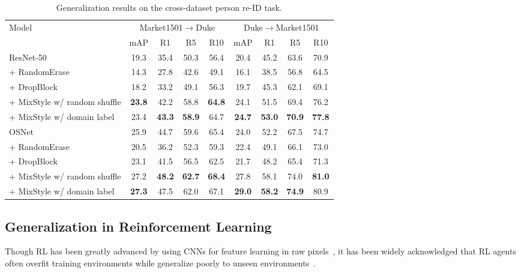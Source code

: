 \documentclass{article} \usepackage{iclr2021_conference,times}
\newcommand{\tableCellHeight}{1}
\newcommand{\tabstyle}[1]{
  \setlength{\tabcolsep}{#1}
  \renewcommand{\arraystretch}{\tableCellHeight}
  \centering
}
\begin{document}
\begin{table}[t]
\tabstyle{6pt}
\caption{Generalization results on the cross-dataset person re-ID task.}
\label{tab:result_reid}
\begin{tabular}{l | c c c c | c c c c}
\hline
\multirow{2}{*}{Model} & \multicolumn{4}{c|}{Market1501$\to$Duke} & \multicolumn{4}{c}{Duke$\to$Market1501} \\
& mAP & R1 & R5 & R10 & mAP & R1 & R5 & R10 \\
\hline \hline
ResNet-50 & 19.3 & 35.4	& 50.3 & 56.4 & 20.4 & 45.2 & 63.6 & 70.9 \\
+ RandomErase & 14.3 & 27.8 & 42.6 & 49.1 & 16.1 & 38.5 & 56.8 & 64.5 \\
+ DropBlock & 18.2 & 33.2 & 49.1 & 56.3 & 19.7 & 45.3 & 62.1 & 69.1 \\
+ MixStyle w/ random shuffle & \textbf{23.8} & {42.2} & {58.8} & \textbf{64.8} & {24.1} & {51.5} & {69.4} & {76.2} \\
+ MixStyle w/ domain label & 23.4 & \textbf{43.3} & \textbf{58.9} & 64.7 & \textbf{24.7} & \textbf{53.0} & \textbf{70.9} & \textbf{77.8} \\
\hline
OSNet & 25.9 & 44.7 & 59.6 & 65.4 & 24.0 & 52.2 & 67.5 & 74.7 \\
+ RandomErase & 20.5 & 36.2 & 52.3 & 59.3 & 22.4 & 49.1 & 66.1 & 73.0 \\
+ DropBlock & 23.1 & 41.5 & 56.5 & 62.5 & 21.7 & 48.2 & 65.4 & 71.3 \\
+ MixStyle w/ random shuffle & {27.2} & \textbf{48.2} & \textbf{62.7} & \textbf{68.4} & {27.8} & {58.1} & {74.0} & \textbf{81.0} \\
+ MixStyle w/ domain label & \textbf{27.3} & 47.5 & 62.0 & 67.1 & \textbf{29.0} & \textbf{58.2} & \textbf{74.9} & 80.9 \\
\hline
\end{tabular}
\end{table}


\subsection{Generalization in Reinforcement Learning} \label{sec:experiments:rl}
Though RL has been greatly advanced by using CNNs for feature learning in raw pixels~\citep{mnih2013playing}, it has been widely acknowledged that RL agents often overfit training environments while generalize poorly to unseen environments~\citep{cobbe2019quantifying,igl2019generalization}. 
\end{document}

